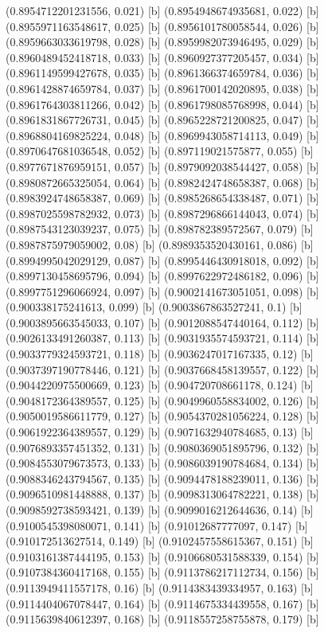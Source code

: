 {{{(0.8954712201231556, 0.021) [b] 
(0.8954948674935681, 0.022) [b] 
(0.8955971163548617, 0.025) [b] 
(0.8956101780058544, 0.026) [b] 
(0.8959663033619798, 0.028) [b] 
(0.8959982073946495, 0.029) [b] 
(0.8960489452418718, 0.033) [b] 
(0.8960927377205457, 0.034) [b] 
(0.8961149599427678, 0.035) [b] 
(0.8961366374659784, 0.036) [b] 
(0.8961428874659784, 0.037) [b] 
(0.8961700142020895, 0.038) [b] 
(0.8961764303811266, 0.042) [b] 
(0.8961798085768998, 0.044) [b] 
(0.8961831867726731, 0.045) [b] 
(0.8965228721200825, 0.047) [b] 
(0.8968804169825224, 0.048) [b] 
(0.8969943058714113, 0.049) [b] 
(0.8970647681036548, 0.052) [b] 
(0.897119021575877, 0.055) [b] 
(0.8977671876959151, 0.057) [b] 
(0.8979092038544427, 0.058) [b] 
(0.8980872665325054, 0.064) [b] 
(0.8982424748658387, 0.068) [b] 
(0.8983924748658387, 0.069) [b] 
(0.8985268654338487, 0.071) [b] 
(0.8987025598782932, 0.073) [b] 
(0.8987296866144043, 0.074) [b] 
(0.8987543123039237, 0.075) [b] 
(0.898782389572567, 0.079) [b] 
(0.8987875979059002, 0.08) [b] 
(0.8989353520430161, 0.086) [b] 
(0.8994995042029129, 0.087) [b] 
(0.8995446430918018, 0.092) [b] 
(0.8997130458695796, 0.094) [b] 
(0.8997622972486182, 0.096) [b] 
(0.8997751296066924, 0.097) [b] 
(0.9002141673051051, 0.098) [b] 
(0.900338175241613, 0.099) [b] 
(0.9003867863527241, 0.1) [b] 
(0.9003895663545033, 0.107) [b] 
(0.9012088547440164, 0.112) [b] 
(0.9026133491260387, 0.113) [b] 
(0.9031935574593721, 0.114) [b] 
(0.9033779324593721, 0.118) [b] 
(0.9036247017167335, 0.12) [b] 
(0.9037397190778446, 0.121) [b] 
(0.9037668458139557, 0.122) [b] 
(0.9044220975500669, 0.123) [b] 
(0.904720708661178, 0.124) [b] 
(0.9048172364389557, 0.125) [b] 
(0.9049960558834002, 0.126) [b] 
(0.9050019586611779, 0.127) [b] 
(0.9054370281056224, 0.128) [b] 
(0.9061922364389557, 0.129) [b] 
(0.9071632940784685, 0.13) [b] 
(0.9076893357451352, 0.131) [b] 
(0.9080369051895796, 0.132) [b] 
(0.9084553079673573, 0.133) [b] 
(0.9086039190784684, 0.134) [b] 
(0.9088346243794567, 0.135) [b] 
(0.9094478188239011, 0.136) [b] 
(0.9096510981448888, 0.137) [b] 
(0.9098313064782221, 0.138) [b] 
(0.9098592738593421, 0.139) [b] 
(0.9099016212644636, 0.14) [b] 
(0.9100545398080071, 0.141) [b] 
(0.91012687777097, 0.147) [b] 
(0.910172513627514, 0.149) [b] 
(0.9102457558615367, 0.151) [b] 
(0.9103161387444195, 0.153) [b] 
(0.9106680531588339, 0.154) [b] 
(0.9107384360417168, 0.155) [b] 
(0.9113786217112734, 0.156) [b] 
(0.9113949411557178, 0.16) [b] 
(0.9114383439334957, 0.163) [b] 
(0.9114404067078447, 0.164) [b] 
(0.9114675334439558, 0.167) [b] 
(0.9115639840612397, 0.168) [b] 
(0.9118557258755878, 0.179) [b] 
}}}
